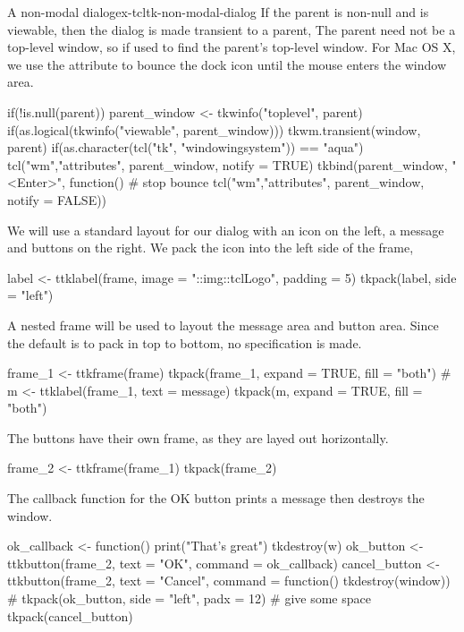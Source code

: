 \begin{example}{A non-modal dialog}{ex-tcltk-non-modal-dialog}
If the parent is non-null and is viewable, then the dialog is made
transient to a parent, The parent need not be a top-level window, so
 if used to find the parent's top-level window. For
Mac OS X, we use the  attribute to bounce the dock icon
until the mouse enters the window area.

\begin{Schunk}
\begin{Sinput}
 if(!is.null(parent)) {
   parent_window <- tkwinfo("toplevel", parent)
   if(as.logical(tkwinfo("viewable", parent_window))) {
     tkwm.transient(window, parent)
     if(as.character(tcl("tk", "windowingsystem")) == "aqua") {
       tcl("wm","attributes", parent_window, notify = TRUE)
       tkbind(parent_window, "<Enter>", function() # stop bounce
              tcl("wm","attributes", parent_window, 
                  notify = FALSE)) 
     }
   }
 }
\end{Sinput}
\end{Schunk}

We will use a standard layout for our dialog with an icon on the left,
a message and buttons on the right. We pack the icon into the left side of the frame,
\begin{Schunk}
\begin{Sinput}
 label <- ttklabel(frame, image = "::img::tclLogo", padding = 5) 
 tkpack(label, side = "left")
\end{Sinput}
\end{Schunk}

A nested frame will be used to layout the message area and button area. Since the  default is to pack in top to bottom, no  specification is made.
\begin{Schunk}
\begin{Sinput}
 frame_1 <- ttkframe(frame)
 tkpack(frame_1, expand = TRUE, fill = "both")
 #
 m <- ttklabel(frame_1, text = message)
 tkpack(m, expand = TRUE, fill = "both")
\end{Sinput}
\end{Schunk}

The buttons have their own frame, as they are layed out horizontally. 
\begin{Schunk}
\begin{Sinput}
 frame_2 <- ttkframe(frame_1)
 tkpack(frame_2)
\end{Sinput}
\end{Schunk}
%
The callback function for the OK button prints a message then destroys the window.
\begin{Schunk}
\begin{Sinput}
 ok_callback <- function() {
   print("That's great")
   tkdestroy(w)
 }
 ok_button <- ttkbutton(frame_2, text = "OK", 
                        command = ok_callback)
 cancel_button <- ttkbutton(frame_2, text = "Cancel", 
                     command = function() tkdestroy(window))
 #
 tkpack(ok_button, side = "left", padx = 12)  # give some space
 tkpack(cancel_button)
\end{Sinput}
\end{Schunk}
%


\end{example}
